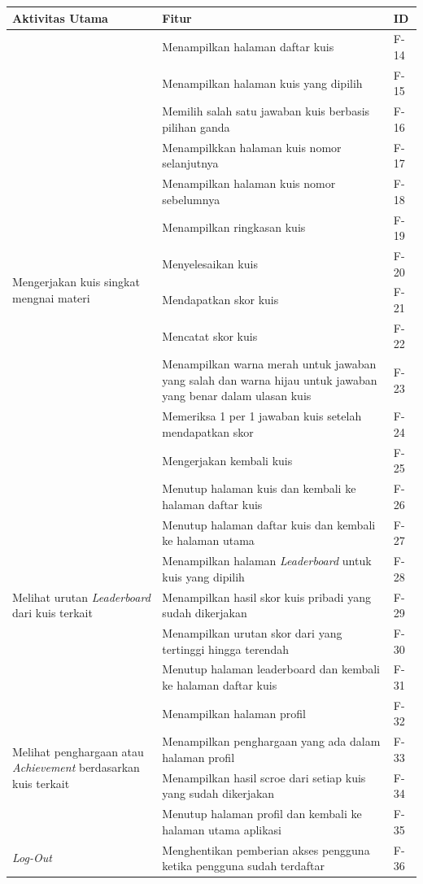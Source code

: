 \newpage
\begin{table}[H]
	\begin{tabular}{|m{3cm}|p{}|p{1cm}|}
		\hline
		\centering\textbf{Aktivitas Utama} & \centering\textbf{Fitur} & \multicolumn{1}{m{1cm}|}{\centering \textbf{ID}} \\
		\hline
		\multirow{14}{2.5cm}{Mengerjakan kuis singkat mengnai materi} &Menampilkan halaman daftar kuis& F-14 \\
		\cline{2-3}
		&Menampilkan halaman kuis yang dipilih& F-15 \\
		\cline{2-3}
		&Memilih salah satu jawaban kuis berbasis pilihan ganda& F-16 \\
		\cline{2-3}
		&Menampilkkan halaman kuis nomor selanjutnya& F-17 \\
		\cline{2-3}
		&Menampilkan halaman kuis nomor sebelumnya& F-18 \\
		\cline{2-3}
		&Menampilkan ringkasan kuis& F-19 \\
		\cline{2-3}
		&Menyelesaikan kuis& F-20 \\
		\cline{2-3}
		&Mendapatkan skor kuis& F-21 \\
		\cline{2-3}
		&Mencatat skor kuis& F-22 \\
		\cline{2-3}
		&Menampilkan warna merah untuk jawaban yang salah dan warna hijau untuk jawaban yang benar dalam ulasan kuis& F-23 \\
		\cline{2-3}
		&Memeriksa 1 per 1 jawaban kuis setelah mendapatkan skor& F-24 \\
		\cline{2-3}
		&Mengerjakan kembali kuis& F-25 \\
		\cline{2-3}
		&Menutup halaman kuis dan kembali ke halaman daftar kuis& F-26 \\
		\cline{2-3}
		&Menutup halaman daftar kuis dan kembali ke halaman utama& F-27 \\
		\hline
		\multirow{3}{3cm}{Melihat urutan \textit{Leaderboard} dari kuis terkait} &Menampilkan halaman \textit{Leaderboard} untuk kuis yang dipilih & F-28 \\
		\cline{2-3}
		&Menampilkan hasil skor kuis pribadi yang sudah dikerjakan& F-29 \\
		\cline{2-3}
		&Menampilkan urutan skor dari yang tertinggi hingga terendah& F-30 \\
		\cline{2-3}
		&Menutup halaman leaderboard dan kembali ke halaman daftar kuis& F-31\\
		\hline
		\multirow{4}{3cm}{Melihat penghargaan atau \textit{Achievement} berdasarkan kuis terkait} &Menampilkan halaman profil& F-32 \\
		\cline{2-3}
		&Menampilkan penghargaan yang ada dalam halaman profil& F-33 \\
		\cline{2-3}
		&Menampilkan hasil scroe dari setiap kuis yang sudah dikerjakan& F-34 \\
		\cline{2-3}
		&Menutup halaman profil dan kembali ke halaman utama aplikasi& F-35 \\
		\hline
		\multirow{1}{2.5cm}{\textit{Log-Out}} &Menghentikan pemberian akses pengguna ketika pengguna sudah terdaftar& F-36 \\
		\hline
	\end{tabular}
\end{table}
